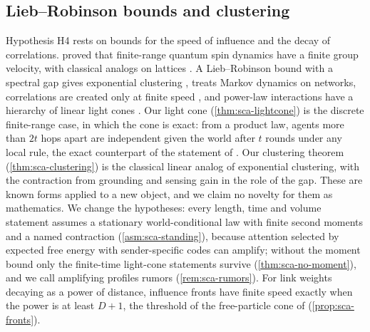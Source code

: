 \subsection{Lieb--Robinson bounds and clustering}\label{sec:rel-lieb}

Hypothesis H4 rests on bounds for the speed of influence and the decay of correlations. \citet{lieb1972finite} proved that finite-range quantum spin dynamics have a finite group velocity, with classical analogs on lattices \citep{marchioro1978velocity,raz2009estimating}. A Lieb--Robinson bound with a spectral gap gives exponential clustering \citep{nachtergaele2006lieb,hastings2006spectral}, \citet{hastings2004locality} treats Markov dynamics on networks, correlations are created only at finite speed \citep{bravyi2006lieb}, and power-law interactions have a hierarchy of linear light cones \citep{tran2020hierarchy}. Our light cone (\cref{thm:sca-lightcone}) is the discrete finite-range case, in which the cone is exact: from a product law, agents more than $2t$ hops apart are independent given the world after $t$ rounds under any local rule, the exact counterpart of the statement of \citet{bravyi2006lieb}. Our clustering theorem (\cref{thm:sca-clustering}) is the classical linear analog of exponential clustering, with the contraction from grounding and sensing gain in the role of the gap. These are known forms applied to a new object, and we claim no novelty for them as mathematics. We change the hypotheses: every length, time and volume statement assumes a stationary world-conditional law with finite second moments and a named contraction (\cref{asm:sca-standing}), because attention selected by expected free energy with sender-specific codes can amplify; without the moment bound only the finite-time light-cone statements survive (\cref{thm:sca-no-moment}), and we call amplifying profiles rumors (\cref{rem:sca-rumors}). For link weights decaying as a power of distance, influence fronts have finite speed exactly when the power is at least $D+1$, the threshold of the free-particle cone of \citet{tran2020hierarchy} (\cref{prop:sca-fronts}).

